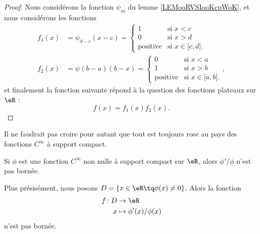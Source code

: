 \begin{proof}
	Nous considérons la fonction \( \psi_m\) du lemme \ref{LEMooRVSIooKcpWoK}, et nous considérons les fonctions
	\begin{subequations}
		\begin{align}
			f_1(x) & =\psi_{d-c}(x-c)=\begin{cases}
				                          1               & \text{si } x<c                               \\
				                          0               & \text{si } x>d                               \\
				                          \text{positive} & \text{si } x\in\mathopen[ c , d \mathclose].
			                          \end{cases} \\
			f_2(x) & =\psi(b-a)(b-x)=\begin{cases}
				                         0               & \text{si } x<a                                \\
				                         1               & \text{si } x>b                                \\
				                         \text{positive} & \text{si } x\in \mathopen[ a , b \mathclose].
			                         \end{cases},
		\end{align}
	\end{subequations}
	et finalement la fonction suivante répond à la question des fonctions plateaux sur \( \eR\) :
	\begin{equation}    \label{EqIHAFooXjfcll}
		f(x)=f_1(x)f_2(x).
	\end{equation}
\end{proof}




Il ne faudrait pas croire pour autant que tout est toujours rose au pays des fonctions \(  C^{\infty}\) à support compact.

\begin{proposition}
	Si \( \phi\) est une fonction \(  C^{\infty}\) non nulle à support compact sur \( \eR\), alors \( \phi'/\phi\) n'est pas bornée.

	Plus présisément, nous posons \( D=\{ x\in \eR\tq \phi(x)\neq 0 \}\). Alors la fonction
	\begin{equation}
		\begin{aligned}
			f\colon D & \to \eR                  \\
			x         & \mapsto \phi'(x)/\phi(x)
		\end{aligned}
	\end{equation}
	n'est pas bornée.
\end{proposition}

